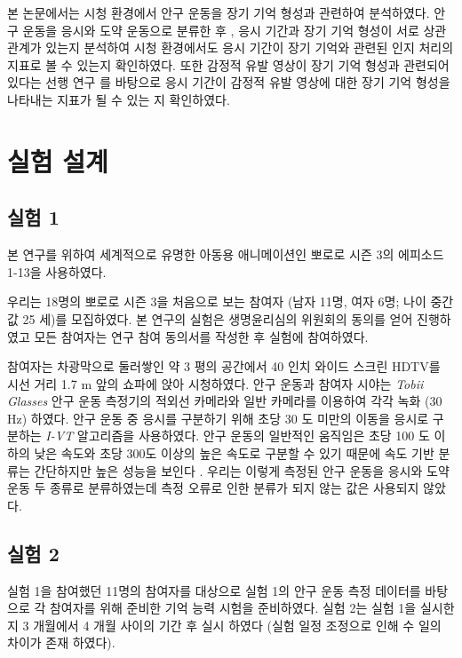 \documentclass{kcc}
\begin{document}
본 논문에서는 시청 환경에서 안구 운동을 장기 기억 형성과 관련하여 분석하였다. 안구 운동을 응시와 도약 운동으로 분류한 후 \cite{Findlay1999,Feng2003,Feng2006}, 응시 기간과 장기 기억 형성이 서로 상관 관계가 있는지 분석하여 시청 환경에서도 응시 기간이 장기 기억와 관련된 인지 처리의 지표로 볼 수 있는지 확인하였다. 또한 감정적 유발 영상이 장기 기억 형성과 관련되어 있다는 선행 연구 \cite{Cahill1996amyg,Cahill1998baso}를 바탕으로 응시 기간이 감정적 유발 영상에 대한 장기 기억 형성을 나타내는 지표가 될 수 있는 지 확인하였다. 

\section{실험 설계}

\subsection{실험 1}
본 연구를 위하여 세계적으로 유명한 아동용 애니메이션인 뽀로로 시즌 3의 에피소드 1-13을 사용하였다. 

우리는 18명의 뽀로로 시즌 3을 처음으로 보는 참여자 (남자 11명, 여자 6명; 나이 중간 값 25 세)를 모집하였다. 본 연구의 실험은 생명윤리심의 위원회의 동의를 얻어 진행하였고 모든 참여자는 연구 참여 동의서를 작성한 후 실험에 참여하였다.

참여자는 차광막으로 둘러쌓인 약 3 평의 공간에서 40 인치 와이드 스크린 HDTV를 시선 거리 1.7 m 앞의 쇼파에 앉아 시청하였다. 안구 운동과 참여자 시야는 \textit{Tobii Glasses} 안구 운동 측정기의 적외선 카메라와 일반 카메라를 이용하여 각각 녹화 (30 Hz) 하였다. 안구 운동 중 응시를 구분하기 위해 초당 30 도 미만의 이동을 응시로 구분하는 \textit{I-VT} 알고리즘을 사용하였다. 안구 운동의 일반적인 움직임은 초당 100 도 이하의 낮은 속도와 초당 300도 이상의 높은 속도로 구분할 수 있기 때문에 속도 기반 분류는 간단하지만 높은 성능을 보인다 \cite{Salvucci2000}. 우리는 이렇게 측정된 안구 운동을 응시와 도약 운동 두 종류로 분류하였는데 측정 오류로 인한 분류가 되지 않는 값은 사용되지 않았다. 


\subsection{실험 2}
\label{subsec:experiment2}
실험 1을 참여했던 11명의 참여자를 대상으로 실험 1의 안구 운동 측정 데이터를 바탕으로 각 참여자를 위해 준비한 기억 능력 시험을 준비하였다. 실험 2는 실험 1을 실시한 지 3 개월에서 4 개월 사이의 기간 후 실시 하였다 (실험 일정 조정으로 인해 수 일의 차이가 존재 하였다).
\end{document}
